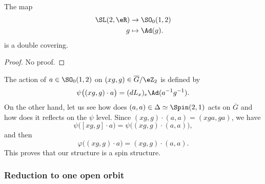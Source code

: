 \begin{lemma}
	The map
	\begin{equation}
		\begin{aligned}
			\SL(2,\eR) & \to \SO_{0}(1,2) \\
			g          & \mapsto\Ad(g).
		\end{aligned}
	\end{equation}
	is a double covering.
\end{lemma}
\begin{proof}
	No proof.
\end{proof}
The action of $a\in\SO_{0}(1,2)$ on $(xg,g)\in\overline{G}/\eZ_{2}$ is defined by
\begin{equation}
	\psi\big( (xg,g)\cdot a \big)=(dL_{x})_{e}\Ad(a^{-1}g^{-1}).
\end{equation}
On the other hand, let us see how does $(a,a)\in\Delta\simeq \Spin(2,1)$ acts on $\overline{G}$ and how does it reflects on the $\psi$ level. Since $(xg,g)\cdot (a,a)=(xga,ga)$, we have
\[
	\psi\big( [xg,g]\cdot a \big)=\psi\big( (xg,g)\cdot(a,a) \big),
\]
and then
\[
	\varphi\big( (xg,g)\cdot a \big)=(xg,g)\cdot(a,a).
\]
This proves that our structure is a spin structure.

\subsubsection{Reduction to one open orbit}

